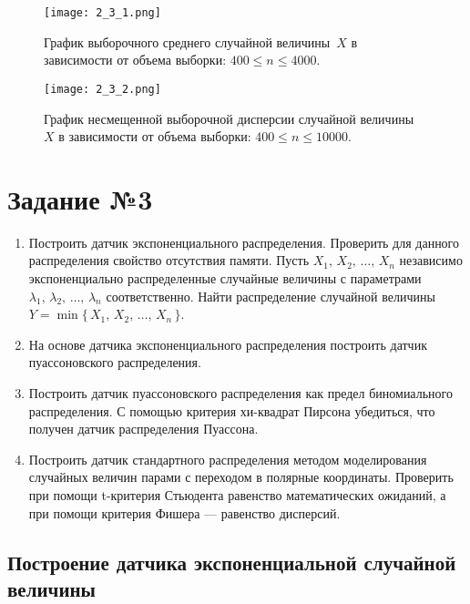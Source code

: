 \documentclass[a4paper, 11pt]{article}
\theoremstyle{def}
\theoremstyle{th}
\theoremstyle{rem}
\begin{document}
\begin{figure}[H]
        \centering
        \texttt{[image: 2\_3\_1.png]}
        \caption{График выборочного среднего случайной величины~$X$ в зависимости от объема выборки: $400\leqslant n \leqslant 4000$.}
\end{figure}
\begin{figure}[H]
        \centering
        \texttt{[image: 2\_3\_2.png]}
        \caption{График несмещенной выборочной дисперсии случайной величины~$X$ в зависимости от объема выборки: $400\leqslant n \leqslant 10000$.}
\end{figure}





\section{Задание №3}

\begin{enumerate}
        \item Построить датчик экспоненциального распределения. 
        Проверить для данного распределения свойство отсутствия памяти. Пусть $X_1,\,X_2,\,\ldots,\,X_n$ независимо экспоненциально распределенные случайные величины с параметрами $\lambda_1,\,\lambda_2,\,\ldots,\,\lambda_n$ соответственно. 
        Найти распределение случайной величины $Y = \min\{\,X_1,\,X_2,\,\ldots,\,X_n\,\}$.
        \item На основе датчика экспоненциального распределения построить датчик пуассоновского распределения.
        \item Построить датчик пуассоновского распределения как предел биномиального распределения.
        С помощью критерия хи-квадрат Пирсона убедиться, что получен датчик распределения Пуассона.
        \item Построить датчик стандартного распределения методом моделирования случайных величин парами с переходом в полярные координаты. Проверить при помощи t-критерия Стьюдента равенство математических ожиданий, а при помощи критерия Фишера --- равенство дисперсий.
\end{enumerate}


\subsection{Построение датчика экспоненциальной случайной величины}
\end{document}

